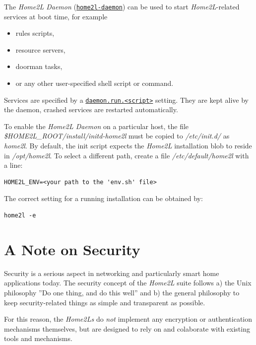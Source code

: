 \documentclass[12pt,english,parskip=half,headheight=19pt]{scrreprt}
\newcommand{\idx}[1]{#1\index{#1}}
\newcommand{\refenv}[1]{\hyperref[env:#1]{\texttt{#1}}}        %
\newcommand{\reftool}[1]{\hyperref[tool:#1]{\texttt{\idx{#1}}}}
\begin{document}
The \textit{Home2L Daemon} (\reftool{home2l-daemon}) can be used to start
\textit{Home2L}-related services at boot time, for example

\begin{itemize}
\item
  rules scripts,
\item
  resource servers,
\item
  doorman tasks,
\item
  or any other user-specified shell script or command.
\end{itemize}

Services are specified by a \refenv{daemon.run.<script>} setting.
They are kept alive by the daemon, crashed services are restarted automatically.

To enable the \textit{Home2L Daemon} on a particular host, the file
\textit{\$HOME2L\_ROOT/install/initd-home2l} must be copied to
\textit{/etc/init.d/} as \textit{home2l}. By default, the init
script expects the \textit{Home2L} installation blob to reside in
\textit{/opt/home2l}. To select a different path, create a file
\textit{/etc/default/home2l} with a line:
\begin{lstlisting}
HOME2L_ENV=<your path to the 'env.sh' file>
\end{lstlisting}

The correct setting for a running installation can be obtained by:
\begin{lstlisting}
home2l -e
\end{lstlisting}





\section{A Note on Security}
\label{sec:security}


Security is a serious aspect in networking and particularly smart home applications today.
The security concept of the \textit{Home2L} suite follows a) the Unix philosophy
''Do one thing, and do this well'' and b) the general philosophy to keep
security-related things as simple and transparent as possible.

For this reason, the \textit{Home2Ls} do \textit{not} implement any encryption or authentication mechanisms themselves, but are designed to rely on and colaborate with existing tools and mechanisms.
\end{document}

